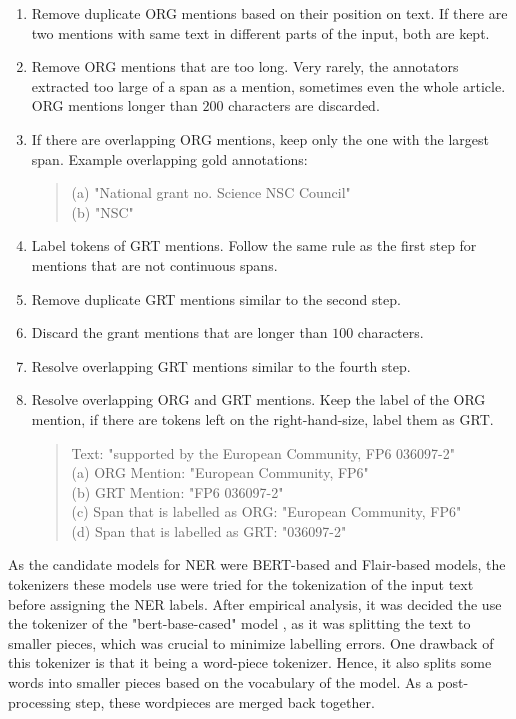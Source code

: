 \documentclass{article}
\theoremstyle{definition}
\theoremstyle{remark}
\begin{document}
\begin{enumerate}
    \item Remove duplicate ORG mentions based on their position on text. If there are two mentions with same text in different parts of the input, both are kept.
    \item Remove ORG mentions that are too long. Very rarely, the annotators extracted too large of a span as a mention, sometimes even the whole article. ORG mentions longer than $200$ characters are discarded.
    \item If there are overlapping ORG mentions, keep only the one with the largest span. Example overlapping gold annotations:
    \begin{quote}
        (a) "National grant no. Science NSC Council" \\
        (b) "NSC"
    \end{quote}
    \item Label tokens of GRT mentions. Follow the same rule as the first step for mentions that are not continuous spans.
    \item Remove duplicate GRT mentions similar to the second step.
    \item Discard the grant mentions that are longer than $100$ characters. 
    \item Resolve overlapping GRT mentions similar to the fourth step.
    \item Resolve overlapping ORG and GRT mentions. Keep the label of the ORG mention, if there are tokens left on the right-hand-size, label them as GRT. 
    \begin{quote}
        Text: "supported by the European Community, FP6 036097-2" \\
        (a) ORG Mention: "European Community, FP6" \\
        (b) GRT Mention: "FP6 036097-2" \\
        (c) Span that is labelled as ORG: "European Community, FP6" \\
        (d) Span that is labelled as GRT: "036097-2"
    \end{quote}
\end{enumerate}
    As the candidate models for NER were BERT-based \cite{BERT} and Flair-based \cite{flairpaper} models, the tokenizers these models use were tried for the tokenization of the input text before assigning the NER labels. After empirical analysis, it was decided the use the tokenizer of the "bert-base-cased" model \cite{BERT}, as it was splitting the text to smaller pieces, which was crucial to minimize labelling errors. One drawback of this tokenizer is that it being a word-piece tokenizer. Hence, it also splits some words into smaller pieces based on the vocabulary of the model. As a post-processing step, these wordpieces are merged back together.
\end{document}
